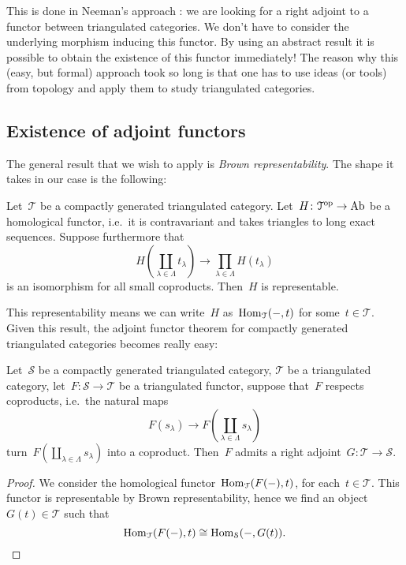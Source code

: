 This is done in Neeman's approach \cite{neeman-grothendieck-duality-bousfield-brown}: we are looking for a right adjoint to a functor between triangulated categories. We don't have to consider the underlying morphism inducing this functor. By using an abstract result it is possible to obtain the existence of this functor immediately! The reason why this (easy, but formal) approach took so long is that one has to use ideas (or tools) from topology and apply them to study triangulated categories.

\subsection{Existence of adjoint functors}
The general result that we wish to apply is \emph{Brown representability}. The shape it takes in our case is the following:
\begin{theorem}
  \label{theorem:brown-representability}
  Let~$\mathcal{T}$ be a compactly generated triangulated category. Let~$H\colon\mathcal{T}^{\mathrm{op}}\to\mathrm{Ab}$ be a homological functor, i.e.\ it is contravariant and takes triangles to long exact sequences. Suppose furthermore that
  \begin{equation}
    H\left( \coprod_{\lambda\in\Lambda}t_\lambda \right)\to\prod_{\lambda\in\Lambda}H(t_\lambda)
  \end{equation}
  is an isomorphism for all small coproducts. Then~$H$ is representable.
\end{theorem}
This representability means we can write~$H$ as~$\operatorname{Hom}_{\mathcal{T}}(-,t)$ for some~$t\in\mathcal{T}$. Given this result, the adjoint functor theorem for compactly generated triangulated categories becomes really easy:
\begin{theorem}
  Let~$\mathcal{S}$ be a compactly generated triangulated category, $\mathcal{T}$ be a triangulated category, let~$F\colon\mathcal{S}\to\mathcal{T}$ be a triangulated functor, suppose that~$F$ respects coproducts, i.e.\ the natural maps
  \begin{equation}
    F(s_\lambda)\to F\left( \coprod_{\lambda\in\Lambda}s_\lambda \right)
  \end{equation}
  turn~$F(\coprod_{\lambda\in\Lambda}s_\lambda)$ into a coproduct. Then~$F$ admits a right adjoint~$G\colon\mathcal{T}\to\mathcal{S}$.

  \begin{proof}
    We consider the homological functor~$\operatorname{Hom}_{\mathcal{T}}(F(-),t)$, for each~$t\in\mathcal{T}$. This functor is representable by Brown representability, hence we find an object~$G(t)\in\mathcal{T}$ such that
    \begin{equation}
      \operatorname{Hom}_{\mathcal{T}}(F(-),t)\cong\operatorname{Hom}_{\mathcal{S}}(-,G(t)).
    \end{equation}
  \end{proof}
\end{theorem}
